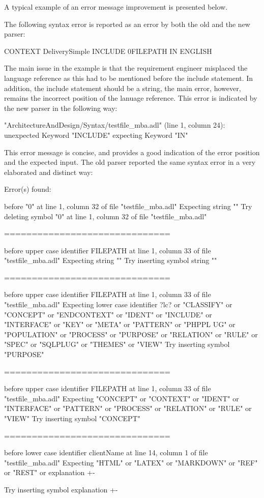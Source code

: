A typical example of an error message improvement is presented below.

The following syntax error is reported as an error by both the old and the new parser:
\begin{adl}
   CONTEXT DeliverySimple INCLUDE 0FILEPATH IN ENGLISH
\end{adl}

The main issue in the example is that the requirement engineer misplaced the language reference as this had to be mentioned before the include statement.
In addition, the include statement should be a string, the main error, however, remains the incorrect position of the lanuage reference.
This error is indicated by the new parser in the following way:
\begin{error}
   "ArchitectureAndDesign/Syntax/testfile_mba.adl" (line 1, column 24):
   unexpected Keyword "INCLUDE"
   expecting Keyword "IN"
\end{error}

This error message is concise, and provides a good indication of the error position and the expected input.
The old parser reported the same syntax error in a very elaborated and distinct way:
\begin{error}
   Error(s) found:

   before "0" at line 1, column 32 of file "testfile_mba.adl"
   Expecting string ""
   Try deleting symbol "0" at line 1, column 32 of file "testfile_mba.adl"

   ==============================

   before upper case identifier FILEPATH at line 1, column 33 of file "testfile_mba.adl"
   Expecting string ""
   Try inserting symbol string ""

   ==============================

   before upper case identifier FILEPATH at line 1, column 33 of file "testfile_mba.adl"
   Expecting lower case identifier ?lc? or "CLASSIFY" or "CONCEPT" or "ENDCONTEXT" or "IDENT" or "INCLUDE" or "INTERFACE" or "KEY" or "META" or "PATTERN" or "PHPPL UG" or "POPULATION" or "PROCESS" or "PURPOSE" or "RELATION" or "RULE" or "SPEC" or "SQLPLUG" or "THEMES" or "VIEW"
   Try inserting symbol "PURPOSE"

   ==============================

   before upper case identifier FILEPATH at line 1, column 33 of file "testfile_mba.adl"
   Expecting "CONCEPT" or "CONTEXT" or "IDENT" or "INTERFACE" or "PATTERN" or "PROCESS" or "RELATION" or "RULE" or "VIEW"
   Try inserting symbol "CONCEPT"

   ==============================

   before lower case identifier clientName at line 14, column 1 of file "testfile_mba.adl"
   Expecting "HTML" or "LATEX" or "MARKDOWN" or "REF" or "REST" or explanation {+-}

   Try inserting symbol explanation {+-}
\end{error}

